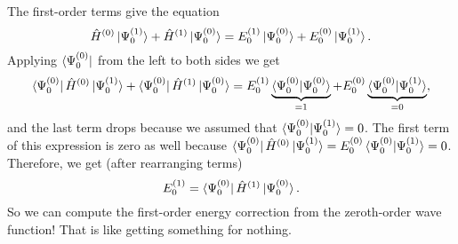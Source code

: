 \documentclass[../Main/chem532-notes.tex]{subfiles}
\begin{document}
The first-order terms give the equation
\begin{equation}
\hat{H}^{(0)}\ket{\Psi_0^{(1)}} + \hat{H}^{(1)}\ket{\Psi_0^{(0)}}= E_0^{(1)}\ket{\Psi_0^{(0)}} + E_0^{(0)}\ket{\Psi_0^{(1)}}.
\end{equation}
Applying $\bra{\Psi_0^{(0)}}$ from the left to both sides we get
\begin{equation}
\bra{\Psi_0^{(0)}}\hat{H}^{(0)}\ket{\Psi_0^{(1)}} + \bra{\Psi_0^{(0)}}\hat{H}^{(1)}\ket{\Psi_0^{(0)}}= E_0^{(1)}\underbrace{\braket{\Psi_0^{(0)}|\Psi_0^{(0)}}}_{=1} + E_0^{(0)}\underbrace{\braket{\Psi_0^{(0)}|\Psi_0^{(1)}}}_{=0},
\end{equation}
and the last term drops because we assumed that $\braket{\Psi_0^{(0)}|\Psi_0^{(1)}}= 0$.
The first term of this expression is zero as well because $\bra{\Psi_0^{(0)}}\hat{H}^{(0)}\ket{\Psi_0^{(1)}} = E_0^{(0)}\braket{\Psi_0^{(0)} | \Psi_0^{(1)}} = 0$.
Therefore, we get (after rearranging terms)
\begin{equation}
 E_0^{(1)} = \bra{\Psi_0^{(0)}}\hat{H}^{(1)}\ket{\Psi_0^{(0)}}.
\end{equation}
So we can compute the first-order energy correction from the zeroth-order wave function! That is like getting something for nothing.
\end{document}
